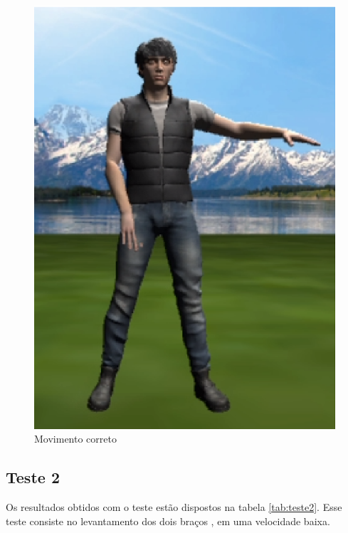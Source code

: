 \begin{figure}[H]
\centering
\includegraphics [keepaspectratio=true,scale=0.60]{figuras/imgteste1.eps}
\caption{Movimento correto}
\label{img2:teste1}
\end{figure}


\subsection{Teste 2}\label{sub:teste2}
Os resultados obtidos com o teste estão dispostos na tabela \ref{tab:teste2}. Esse teste consiste no levantamento dos dois braços , em uma velocidade
baixa.


